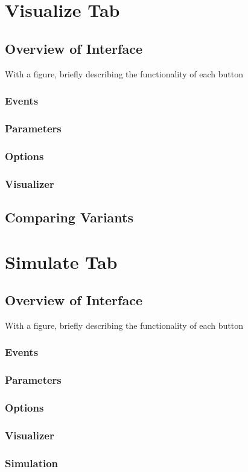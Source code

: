 \documentclass[10pt]{article}
\begin{document}
\section{Visualize Tab}
\label{sec:visualize}
	\subsection{Overview of Interface}
		With a figure, briefly describing the functionality of each button
		\subsubsection{Events}
		\subsubsection{Parameters}
		\subsubsection{Options}
		\subsubsection{Visualizer}
	\subsection{Comparing Variants}

\section{Simulate Tab}
\label{sec:simulate}
	\subsection{Overview of Interface}
	With a figure, briefly describing the functionality of each button
		\subsubsection{Events}
		\subsubsection{Parameters}
		\subsubsection{Options}
		\subsubsection{Visualizer}
		\subsubsection{Simulation}
\end{document}
